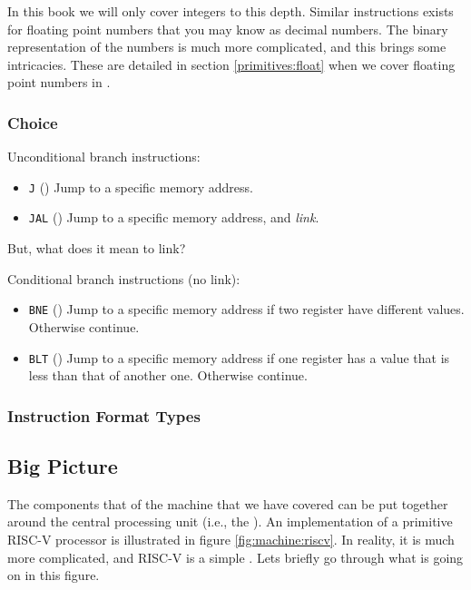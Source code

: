 
In this book we will only cover integers to this depth. Similar instructions exists for floating point numbers that you may know as decimal numbers. The binary representation of the numbers is much more complicated, and this brings some intricacies. These are detailed in section \ref{primitives:float} when we cover floating point numbers in \csharp.

\subsubsection{Choice}


Unconditional branch instructions:
\begin{itemize}
  \item \texttt{J} () Jump to a specific memory address.
  \item \texttt{JAL} () Jump to a specific memory address, and \textsl{link}.
\end{itemize}

But, what does it mean to link? %

Conditional branch instructions (no link):
\begin{itemize}
  \item \texttt{BNE} () Jump to a specific memory address if two register have different values. Otherwise continue.
  \item \texttt{BLT} () Jump to a specific memory address if one register has a value that is less than that of another one. Otherwise continue.
\end{itemize}

\subsubsection{Instruction Format Types}


\subsection{Big Picture}

The components that of the machine that we have covered can be put together around the central processing unit (i.e., the ). An implementation of a primitive RISC-V processor is illustrated in figure \ref{fig:machine:riscv}. In reality, it is much more complicated, and RISC-V is a simple . Lets briefly go through what is going on in this figure.

